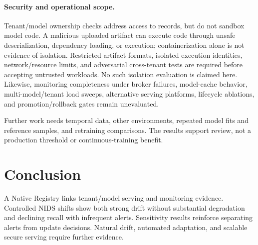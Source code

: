 \documentclass[runningheads]{llncs}
\begin{document}
\paragraph{Security and operational scope.}
Tenant/model ownership checks address access to records, but do not sandbox model code. A malicious uploaded artifact can execute code through unsafe deserialization, dependency loading, or execution; containerization alone is not evidence of isolation. Restricted artifact formats, isolated execution identities, network/resource limits, and adversarial cross-tenant tests are required before accepting untrusted workloads. No such isolation evaluation is claimed here. Likewise, monitoring completeness under broker failures, model-cache behavior, multi-model/tenant load sweeps, alternative serving platforms, lifecycle ablations, and promotion/rollback gates remain unevaluated.

Further work needs temporal data, other environments, repeated model fits and reference samples, and retraining comparisons. The results support review, not a production threshold or continuous-training benefit.

\section{Conclusion}
A Native Registry links tenant/model serving and monitoring evidence. Controlled NIDS shifts show both strong drift without substantial degradation and declining recall with infrequent alerts. Sensitivity results reinforce separating alerts from update decisions. Natural drift, automated adaptation, and scalable secure serving require further evidence.
\end{document}
